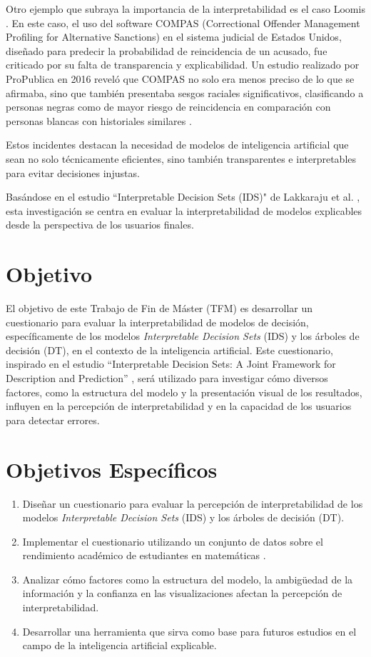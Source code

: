 Otro ejemplo que subraya la importancia de la interpretabilidad es el caso Loomis \cite{bbc-2016}. En este caso, el uso del software COMPAS (Correctional Offender Management Profiling for Alternative Sanctions) en el sistema judicial de Estados Unidos, diseñado para predecir la probabilidad de reincidencia de un acusado, fue criticado por su falta de transparencia y explicabilidad. Un estudio realizado por ProPublica en 2016 reveló que COMPAS no solo era menos preciso de lo que se afirmaba, sino que también presentaba sesgos raciales significativos, clasificando a personas negras como de mayor riesgo de reincidencia en comparación con personas blancas con historiales similares \cite{propublica-2016}.

Estos incidentes destacan la necesidad de modelos de inteligencia artificial que sean no solo técnicamente eficientes, sino también transparentes e interpretables para evitar decisiones injustas.

Basándose en el estudio ``Interpretable Decision Sets (IDS)" de Lakkaraju et al. \cite{lakkaraju-2016}, esta investigación se centra en evaluar la interpretabilidad de modelos explicables desde la perspectiva de los usuarios finales. 

\section{Objetivo}

El objetivo de este Trabajo de Fin de Máster (TFM) es desarrollar un cuestionario para evaluar la interpretabilidad de modelos de decisión, específicamente de los modelos \textit{Interpretable Decision Sets} (IDS) y los árboles de decisión (DT), en el contexto de la inteligencia artificial. Este cuestionario, inspirado en el estudio “Interpretable Decision Sets: A Joint Framework for Description and Prediction” \cite{lakkaraju-2016}, será utilizado para investigar cómo diversos factores, como la estructura del modelo y la presentación visual de los resultados, influyen en la percepción de interpretabilidad y en la capacidad de los usuarios para detectar errores.

\section{Objetivos Específicos}

\begin{enumerate}
    \item Diseñar un cuestionario para evaluar la percepción de interpretabilidad de los modelos \textit{Interpretable Decision Sets} (IDS) y los árboles de decisión (DT).
    \item Implementar el cuestionario utilizando un conjunto de datos sobre el rendimiento académico de estudiantes en matemáticas \cite{cortez-2014}.
    \item Analizar cómo factores como la estructura del modelo, la ambigüedad de la información y la confianza en las visualizaciones afectan la percepción de interpretabilidad.
    \item Desarrollar una herramienta que sirva como base para futuros estudios en el campo de la inteligencia artificial explicable.
\end{enumerate}


